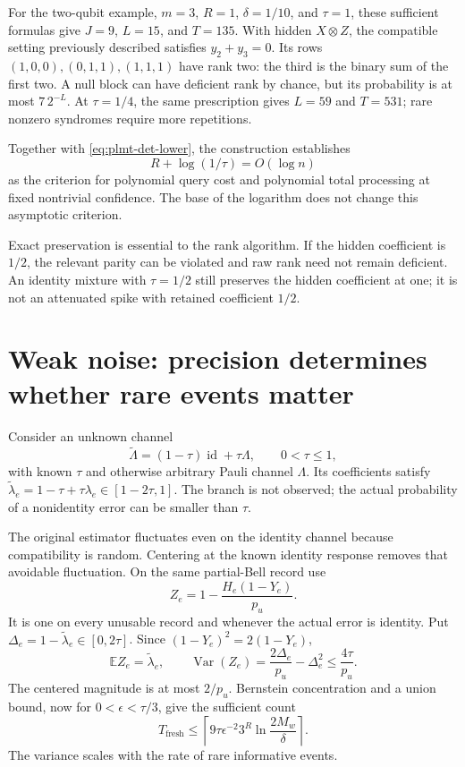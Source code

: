 \documentclass[11pt,a4paper]{article}
\numberwithin{equation}{section}
\theoremstyle{definition}
\theoremstyle{remark}
\begin{document}
For the two-qubit example, \(m=3\), \(R=1\), \(\delta=1/10\), and \(\tau=1\), these sufficient formulas give \(J=9\), \(L=15\), and \(T=135\). With hidden \(X\otimes Z\), the compatible setting previously described satisfies \(y_2+y_3=0\). Its rows \((1,0,0),(0,1,1),(1,1,1)\) have rank two: the third is the binary sum of the first two. A null block can have deficient rank by chance, but its probability is at most \(7\,2^{-L}\). At \(\tau=1/4\), the same prescription gives \(L=59\) and \(T=531\); rare nonzero syndromes require more repetitions.

Together with \eqref{eq:plmt-det-lower}, the construction establishes
\begin{equation}
 \boxed{R+\log(1/\tau)=O(\log n)}
 \label{eq:plmt-det-frontier}
\end{equation}
as the criterion for polynomial query cost and polynomial total processing at fixed nontrivial confidence. The base of the logarithm does not change this asymptotic criterion.

Exact preservation is essential to the rank algorithm. If the hidden coefficient is \(1/2\), the relevant parity can be violated and raw rank need not remain deficient. An identity mixture with \(\tau=1/2\) still preserves the hidden coefficient at one; it is not an attenuated spike with retained coefficient \(1/2\).

\section{Weak noise: precision determines whether rare events matter}
Consider an unknown channel
\begin{equation}
 \widetilde\Lambda=(1-\tau)\operatorname{id}+\tau\Lambda,
 \qquad 0<\tau\leq1,
 \label{eq:plmt-weak-channel}
\end{equation}
with known \(\tau\) and otherwise arbitrary Pauli channel \(\Lambda\). Its coefficients satisfy
\(\widetilde\lambda_e=1-\tau+\tau\lambda_e\in[1-2\tau,1]\).
The branch is not observed; the actual probability of a nonidentity error can be smaller than \(\tau\).

The original estimator fluctuates even on the identity channel because compatibility is random. Centering at the known identity response removes that avoidable fluctuation. On the same partial-Bell record use
\[
 Z_e=1-\frac{H_e(1-Y_e)}{p_u}.
\]
It is one on every unusable record and whenever the actual error is identity. Put
\(\Delta_e=1-\widetilde\lambda_e\in[0,2\tau]\). Since
\((1-Y_e)^2=2(1-Y_e)\),
\begin{equation}
 \mathbb E Z_e=\widetilde\lambda_e,\qquad
 \operatorname{Var}(Z_e)=\frac{2\Delta_e}{p_u}-\Delta_e^2
 \leq\frac{4\tau}{p_u}.
\end{equation}
The centered magnitude is at most \(2/p_u\). Bernstein concentration and a union bound, now for \(0<\epsilon<\tau/3\), give the sufficient count
\begin{equation}
 T_{\mathrm{fresh}}\leq
 \left\lceil9\tau\epsilon^{-2}3^R
 \ln\frac{2M_w}{\delta}\right\rceil.
 \label{eq:plmt-weak-upper}
\end{equation}
The variance scales with the rate of rare informative events.
\end{document}
